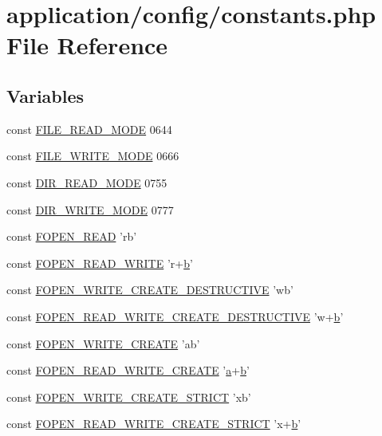 \hypertarget{constants_8php}{\section{application/config/constants.php File Reference}
\label{constants_8php}
}
\subsection*{Variables}
\begin{DoxyCompactItemize}
\item 
const \hyperlink{constants_8php_afa80a675a7a8436c2b299e41c63fd405}{F\-I\-L\-E\-\_\-\-R\-E\-A\-D\-\_\-\-M\-O\-D\-E} 0644
\item 
const \hyperlink{constants_8php_a6b9fcdc9259bf9361e8f97e289024242}{F\-I\-L\-E\-\_\-\-W\-R\-I\-T\-E\-\_\-\-M\-O\-D\-E} 0666
\item 
const \hyperlink{constants_8php_a5eb43292f0c56482a7869db8adb1c91d}{D\-I\-R\-\_\-\-R\-E\-A\-D\-\_\-\-M\-O\-D\-E} 0755
\item 
const \hyperlink{constants_8php_aac7345ea170768d48be7cde8ebf6b147}{D\-I\-R\-\_\-\-W\-R\-I\-T\-E\-\_\-\-M\-O\-D\-E} 0777
\item 
const \hyperlink{constants_8php_ab6a0a1c6e9ea5f7625b2dba2f7bd286c}{F\-O\-P\-E\-N\-\_\-\-R\-E\-A\-D} 'rb'
\item 
const \hyperlink{constants_8php_ab98552969950ea978284c998e10d0153}{F\-O\-P\-E\-N\-\_\-\-R\-E\-A\-D\-\_\-\-W\-R\-I\-T\-E} 'r+\hyperlink{bootstrap_8min_8js_a7c192e47b11481e4717b9f1e04eb4420}{b}'
\item 
const \hyperlink{constants_8php_a246692af603ceac463cab532d81a6048}{F\-O\-P\-E\-N\-\_\-\-W\-R\-I\-T\-E\-\_\-\-C\-R\-E\-A\-T\-E\-\_\-\-D\-E\-S\-T\-R\-U\-C\-T\-I\-V\-E} 'wb'
\item 
const \hyperlink{constants_8php_a1b8581dfce24061e847cc257aed23d62}{F\-O\-P\-E\-N\-\_\-\-R\-E\-A\-D\-\_\-\-W\-R\-I\-T\-E\-\_\-\-C\-R\-E\-A\-T\-E\-\_\-\-D\-E\-S\-T\-R\-U\-C\-T\-I\-V\-E} 'w+\hyperlink{bootstrap_8min_8js_a7c192e47b11481e4717b9f1e04eb4420}{b}'
\item 
const \hyperlink{constants_8php_a7c5689a170bbaab4dd9c6f3a76bd7a0d}{F\-O\-P\-E\-N\-\_\-\-W\-R\-I\-T\-E\-\_\-\-C\-R\-E\-A\-T\-E} 'ab'
\item 
const \hyperlink{constants_8php_adcd04289bf4dc262b7652cb4c1eb08f7}{F\-O\-P\-E\-N\-\_\-\-R\-E\-A\-D\-\_\-\-W\-R\-I\-T\-E\-\_\-\-C\-R\-E\-A\-T\-E} '\hyperlink{bootstrap_8min_8js_a7318f59fb86a4437995ee89c780c51ac}{a}+\hyperlink{bootstrap_8min_8js_a7c192e47b11481e4717b9f1e04eb4420}{b}'
\item 
const \hyperlink{constants_8php_a02007ca17f39af174ac54d30f2ca7e82}{F\-O\-P\-E\-N\-\_\-\-W\-R\-I\-T\-E\-\_\-\-C\-R\-E\-A\-T\-E\-\_\-\-S\-T\-R\-I\-C\-T} 'xb'
\item 
const \hyperlink{constants_8php_a2eeb98a015d74560e9b60ec60d7531d4}{F\-O\-P\-E\-N\-\_\-\-R\-E\-A\-D\-\_\-\-W\-R\-I\-T\-E\-\_\-\-C\-R\-E\-A\-T\-E\-\_\-\-S\-T\-R\-I\-C\-T} 'x+\hyperlink{bootstrap_8min_8js_a7c192e47b11481e4717b9f1e04eb4420}{b}'
\end{DoxyCompactItemize}


